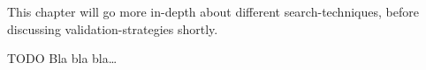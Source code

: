 This chapter will go more in-depth about different search-techniques, before discussing validation-strategies shortly. 


TODO
Bla bla bla\ldots






